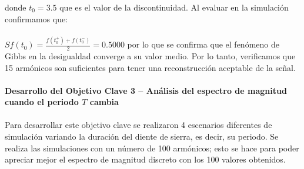 \documentclass[8pt]{article}
\begin{document}
    donde $t_0=3.5$ que es el valor de la discontinuidad. Al evaluar en la simulación 
    confirmamos que:\\
    \\
     $Sf(t_0)=\frac{f(t_0^+)+f(t_0^-)}{2}=0.5000$ por lo que se confirma que el fenómeno de Gibbs 
     en la desigualdad converge a su valor medio. Por lo tanto, verificamos que 15 armónicos 
     son suficientes para tener una reconstrucción aceptable de la señal. \\
     \\
     \textbf{Desarrollo del Objetivo Clave 3 -- Análisis del espectro de magnitud cuando el periodo $T$ cambia}
     \\
     \\
     Para desarrollar este objetivo clave se realizaron 4 escenarios diferentes de simulación variando la 
     duración del diente de sierra, es decir, su periodo. Se realiza las simulaciones con un número 
     de 100 armónicos; esto se hace para poder apreciar mejor el espectro de magnitud 
     discreto con los 100 valores obtenidos.
\end{document}
